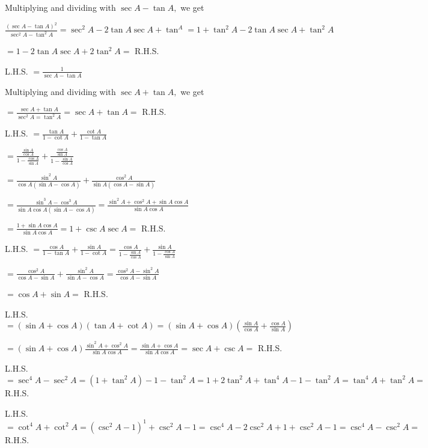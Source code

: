     Multiplying and dividing with $\sec A - \tan A,$ we get

    $\frac{(\sec A - \tan A)^2}{\sec^2A - \tan^2A} = \sec^2A - 2\tan A\sec A + \tan^A = 1 + \tan^2A - 2\tan A\sec A +
    \tan^2A$

    $= 1 - 2\tan A\sec A + 2\tan^2A =$ R.H.S.

\item L.H.S. $= \frac{1}{\sec A - \tan A}$

    Multiplying and dividing with $\sec A + \tan A,$ we get

    $= \frac{\sec A + \tan A}{\sec^2A = \tan^2A} = \sec A + \tan A =$ R.H.S.

\item L.H.S. $= \frac{\tan A}{1 - \cot A} + \frac{\cot A}{1 - \tan A}$

    $= \frac{\frac{\sin A}{\cos A}}{1 - \frac{\cos A}{\sin A}} + \frac{\frac{\cos A}{\sin A}}{1 - \frac{\sin A}{\cos A}}$

    $= \frac{\sin^2A}{\cos A(\sin A - \cos A)} + \frac{\cos^2A}{\sin A(\cos A - \sin A)}$

    $= \frac{\sin^3A - \cos^3A}{\sin A\cos A(\sin A - \cos A)} = \frac{\sin^2A + \cos^2A + \sin A\cos A}{\sin A\cos A}$

    $= \frac{1 + \sin A \cos A}{\sin A\cos A} = 1 + \csc A\sec A =$ R.H.S.

\item L.H.S. $= \frac{\cos A}{1 - \tan A} + \frac{\sin A}{1 - \cot A} = \frac{\cos A}{1 - \frac{\sin A}{\cos A}} + \frac{\sin
    A}{1 - \frac{\cos A}{\sin A}}$

    $= \frac{\cos^2A}{\cos A - \sin A} + \frac{\sin^2A}{\sin A - \cos A} = \frac{\cos^2A - \sin^2A}{\cos A - \sin A}$

    $= \cos A + \sin A =$ R.H.S.

\item L.H.S. $= (\sin A + \cos A)(\tan A + \cot A) = (\sin A + \cos A)(\frac{\sin A}{\cos A} + \frac{\cos A}{\sin A})$

    $= (\sin A + \cos A)\frac{\sin^2A + \cos^2A}{\sin A\cos A} = \frac{\sin A + \cos A}{\sin A\cos A} = \sec A + \csc A =$
    R.H.S.

\item L.H.S. $= \sec^4A - \sec^2A = (1 + \tan^2A) - 1 - \tan^2A = 1 + 2\tan^2A + \tan^4A - 1 - \tan^2A = \tan^4A + \tan^2A =$
    R.H.S.

\item L.H.S. $= \cot^4A + \cot^2A = (\csc^2A - 1)^1 + \csc^2A - 1 = \csc^4A - 2\csc^2A + 1 + \csc^2A -1 = \csc^4A -
    \csc^2A =$ R.H.S.

